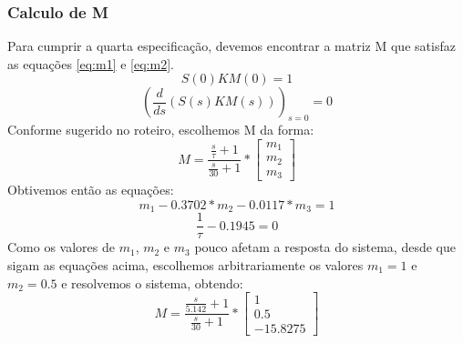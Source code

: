 \documentclass{article}
\begin{document}
\subsubsection{Calculo de M}
Para cumprir a quarta especificação, devemos encontrar a matriz M que satisfaz as equações \ref{eq:m1} e \ref{eq:m2}.
\begin{equation}
\label{eq:m1}
S(0)KM(0) = 1
\end{equation}
\begin{equation}
\label{eq:m2}
(\frac{d}{ds}(S(s)KM(s)))_{s=0}= 0
\end{equation}
Conforme sugerido no roteiro\cite{bb:roteiro}, escolhemos M da forma:
\begin{equation}
\label{eq:mlayout}
M = \frac{\frac{s}{\tau} + 1}{\frac{s}{30} + 1}*\begin{bmatrix}
m_1\\
m_2\\
m_3
\end{bmatrix}
\end{equation}
Obtivemos então as equações:
\begin{equation}
	m_1 - 0.3702*m_2 - 0.0117*m_3 = 1
\end{equation}
\begin{equation}
	\frac{1}{\tau} - 0.1945 = 0
\end{equation}
Como os valores de $m_1$, $m_2$ e $m_3$ pouco afetam a resposta do sistema, desde que sigam as equações acima, escolhemos arbitrariamente os valores $m_1 = 1$ e $m_2 = 0.5$ e resolvemos o sistema, obtendo:
\begin{equation}
\label{eq:mvalor}
M = \frac{\frac{s}{5.142} + 1}{\frac{s}{30} + 1}*
\begin{bmatrix}
	1\\
	0.5\\
	-15.8275
\end{bmatrix}
\end{equation}
\end{document}
